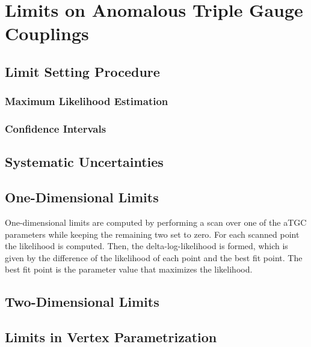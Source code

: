 \chapter{Limits on Anomalous Triple Gauge Couplings}
\label{chap::LimitsonATGCs}


\section{Limit Setting Procedure}
\subsection{Maximum Likelihood Estimation}
\subsection{Confidence Intervals}
\section{Systematic Uncertainties}
\label{sec:systematics}
\section{One-Dimensional Limits}
One-dimensional limits are computed by performing a scan over one of the aTGC parameters while keeping the remaining two set to zero. For each scanned point the likelihood is computed. Then, the delta-log-likelihood is formed, which is given by the difference of the likelihood of each point and the best fit point. The best fit point is the parameter value that maximizes the likelihood.  
\section{Two-Dimensional Limits}
\section{Limits in Vertex Parametrization}